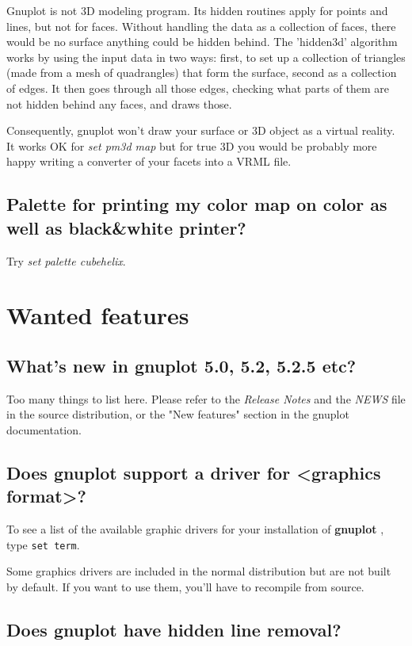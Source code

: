 \documentclass[a4paper,11pt]{article}
\newcommand{\gnuplot}{\textbf{gnuplot }}
\begin{document}
Gnuplot is not 3D modeling program. Its hidden routines apply for points and
lines, but not for faces. 
Without handling the data as a collection of faces, there would be no surface
anything could be hidden behind.  The 'hidden3d' algorithm works by using the
input data in two ways: first, to set up a collection of triangles (made from a
mesh of quadrangles) that form the surface, second as a collection of edges.  It
then goes through all those edges, checking what parts of them are not hidden
behind any faces, and draws those.

Consequently, gnuplot won't draw your surface or 3D object as a virtual reality.
It works OK for \textit{set pm3d map} but for true 3D you would be probably more
happy writing a converter of your facets into a VRML file.


\subsection{Palette for printing my color map on color as well as black\&white
printer?}

Try \textit{set palette cubehelix}.


\section{Wanted features}

\subsection{What's new in \gnuplot 5.0, 5.2, 5.2.5 etc?}

Too many things to list here.
Please refer to the {\em Release Notes} and the \textit{NEWS} file in the
source distribution, or the "New features" section in the gnuplot documentation.


\subsection{Does \gnuplot support a driver for <graphics format>?}

To see a list of the available graphic drivers for your installation of
\gnuplot, type \verb+set term+.

Some graphics drivers are included in the normal distribution
but are not built by default. If you want to use them, you'll
have to recompile from source.


\subsection{Does \gnuplot have hidden line removal?}
\end{document}
